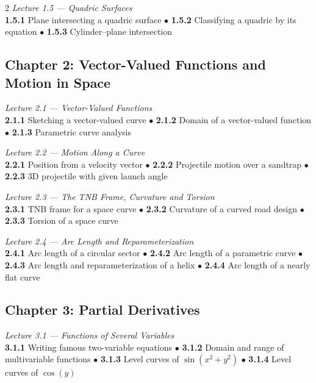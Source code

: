 \begin{multicols}{2}
\medskip
\noindent\textit{Lecture 1.5 --- Quadric Surfaces}\\
\textbf{1.5.1} Plane intersecting a quadric surface \(\bullet\)
\textbf{1.5.2} Classifying a quadric by its equation \(\bullet\)
\textbf{1.5.3} Cylinder--plane intersection

\subsection*{Chapter 2: Vector-Valued Functions and Motion in Space}

\noindent\textit{Lecture 2.1 --- Vector-Valued Functions}\\
\textbf{2.1.1} Sketching a vector-valued curve \(\bullet\)
\textbf{2.1.2} Domain of a vector-valued function \(\bullet\)
\textbf{2.1.3} Parametric curve analysis

\medskip
\noindent\textit{Lecture 2.2 --- Motion Along a Curve}\\
\textbf{2.2.1} Position from a velocity vector \(\bullet\)
\textbf{2.2.2} Projectile motion over a sandtrap \(\bullet\)
\textbf{2.2.3} 3D projectile with given launch angle

\medskip
\noindent\textit{Lecture 2.3 --- The TNB Frame, Curvature and Torsion}\\
\textbf{2.3.1} TNB frame for a space curve \(\bullet\)
\textbf{2.3.2} Curvature of a curved road design \(\bullet\)
\textbf{2.3.3} Torsion of a space curve

\medskip
\noindent\textit{Lecture 2.4 --- Arc Length and Reparameterization}\\
\textbf{2.4.1} Arc length of a circular sector \(\bullet\)
\textbf{2.4.2} Arc length of a parametric curve \(\bullet\)
\textbf{2.4.3} Arc length and reparameterization of a helix \(\bullet\)
\textbf{2.4.4} Arc length of a nearly flat curve

\subsection*{Chapter 3: Partial Derivatives}

\noindent\textit{Lecture 3.1 --- Functions of Several Variables}\\
\textbf{3.1.1} Writing famous two-variable equations \(\bullet\)
\textbf{3.1.2} Domain and range of multivariable functions \(\bullet\)
\textbf{3.1.3} Level curves of $\sin(x^2+y^2)$ \(\bullet\)
\textbf{3.1.4} Level curves of $\cos(y)$


\end{multicols}
